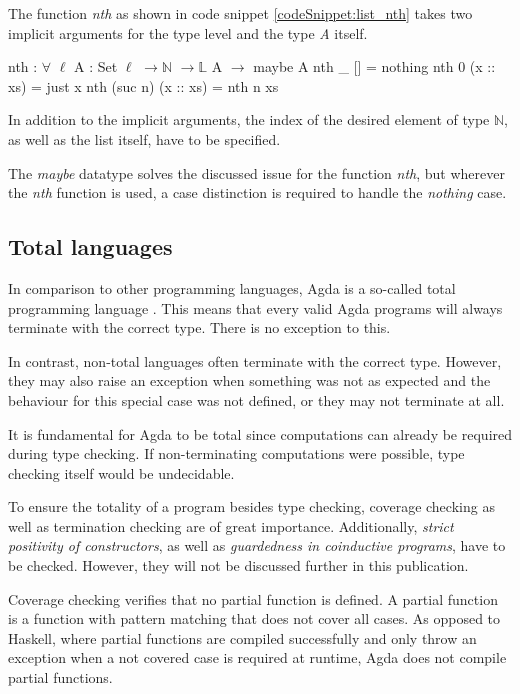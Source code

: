 The function \emph{nth} as shown in code snippet \ref{codeSnippet:list_nth} takes two implicit arguments for the type level and the type \emph{A} itself.

\begin{codesnippet}[mathescape=true, caption={Definition of nth function in Agda}, label={codeSnippet:list_nth}]
nth : $\forall$ {$\ell$} {A : Set $\ell$} $\rightarrow \mathbb{N}$ $\rightarrow \mathbb{L}$ A $\rightarrow$ maybe A
nth _ [] = nothing
nth 0 (x :: xs) = just x
nth (suc n) (x :: xs) = nth n xs
\end{codesnippet}

In addition to the implicit arguments, the index of the desired element of type $\mathbb{N}$, as well as the list itself, have to be specified.

The \emph{maybe} datatype solves the discussed issue for the function \emph{nth}, but wherever the \emph{nth} function is used, a case distinction is required to handle the \emph{nothing} case.

\subsection{Total languages}\label{section:total_languages}
In comparison to other programming languages, Agda is a so-called total programming language \cite{AgdaReadTheDocs}.
This means that every valid Agda programs will always terminate with the correct type. There is no exception to this.

In contrast, non-total languages often terminate with the correct type. 
However, they may also raise an exception when something was not as expected and the behaviour for this special case was not defined, or they may not terminate at all.

It is fundamental for Agda to be total since computations can already be required during type checking.
If non-terminating computations were possible, type checking itself would be undecidable\cite{agda_wiki_totality}.

To ensure the totality of a program besides type checking, coverage checking as well as termination checking are of great importance. 
Additionally, \emph{strict positivity of constructors}, as well as \emph{guardedness in coinductive programs}, have to be checked. However, they will not be discussed further in this publication.

Coverage checking verifies that no partial function is defined. A partial function is a function with pattern matching that does not cover all cases.
As opposed to Haskell, where partial functions are compiled successfully and only throw an exception when a not covered case is required at runtime, Agda does not compile partial functions.

